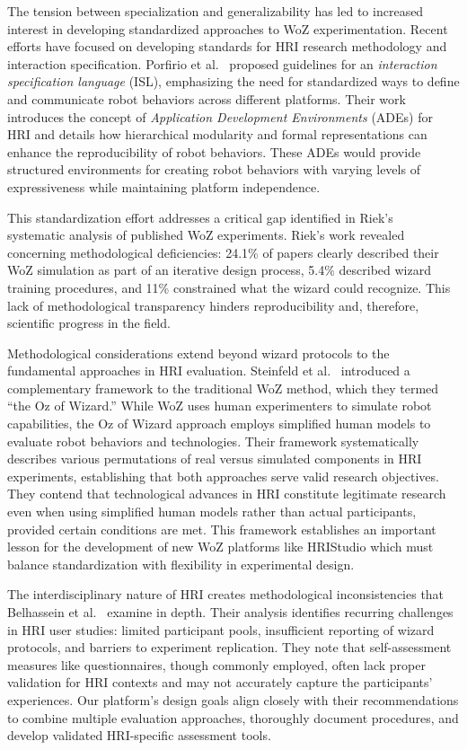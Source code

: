 \documentclass[letterpaper, 10 pt, conference]{subfiles/ieeeconf}
\begin{document}
The tension between specialization and generalizability has led to increased interest in developing standardized approaches to WoZ experimentation. Recent efforts have focused on developing standards for HRI research methodology and interaction specification. Porfirio et al.~\cite{Porfirio2023} proposed guidelines for an \emph{interaction specification language} (ISL), emphasizing the need for standardized ways to define and communicate robot behaviors across different platforms. Their work introduces the concept of \emph{Application Development Environments} (ADEs) for HRI and details how hierarchical modularity and formal representations can enhance the reproducibility of robot behaviors. These ADEs would provide structured environments for creating robot behaviors with varying levels of expressiveness while maintaining platform independence.

This standardization effort addresses a critical gap identified in Riek's~\cite{Riek2012} systematic analysis of published WoZ experiments. Riek's work revealed concerning methodological deficiencies: 24.1\% of papers clearly described their WoZ simulation as part of an iterative design process, 5.4\% described wizard training procedures, and 11\% constrained what the wizard could recognize. This lack of methodological transparency hinders reproducibility and, therefore, scientific progress in the field.

Methodological considerations extend beyond wizard protocols to the fundamental approaches in HRI evaluation. Steinfeld et al.~\cite{Steinfeld2009} introduced a complementary framework to the traditional WoZ method, which they termed ``the Oz of Wizard.'' While WoZ uses human experimenters to simulate robot capabilities, the Oz of Wizard approach employs simplified human models to evaluate robot behaviors and technologies. Their framework systematically describes various permutations of real versus simulated components in HRI experiments, establishing that both approaches serve valid research objectives. They contend that technological advances in HRI constitute legitimate research even when using simplified human models rather than actual participants, provided certain conditions are met. This framework establishes an important lesson for the development of new WoZ platforms like HRIStudio which must balance standardization with flexibility in experimental design.

The interdisciplinary nature of HRI creates methodological inconsistencies that Belhassein et al.~\cite{Belhassein2019} examine in depth. Their analysis identifies recurring challenges in HRI user studies: limited participant pools, insufficient reporting of wizard protocols, and barriers to experiment replication. They note that self-assessment measures like questionnaires, though commonly employed, often lack proper validation for HRI contexts and may not accurately capture the participants' experiences. Our platform's design goals align closely with their recommendations to combine multiple evaluation approaches, thoroughly document procedures, and develop validated HRI-specific assessment tools.
\end{document}

